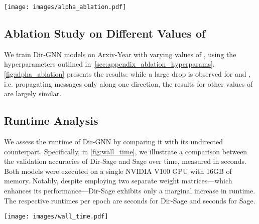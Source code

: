 \documentclass{article}
\newcommand\oursacro{Dir-GNN}
\theoremstyle{plain}
\theoremstyle{definition}
\theoremstyle{remark}
\begin{document}
\begin{figure*}
    \centering
    \texttt{[image: images/alpha\_ablation.pdf]}
    \caption{\oursacro{} test accuracy on Arxiv-Year for different values of the hyperparameter .}
    \label{fig:alpha_ablation}
\end{figure*}

\subsection{Ablation Study on Different Values of \texorpdfstring{}{alpha}}
We train \oursacro{} models on Arxiv-Year with varying values of , using the hyperparameters outlined in~\cref{sec:appendix_ablation_hyperparams}. \cref{fig:alpha_ablation} presents the results: while a large drop is observed for  and , i.e. propagating messages only along one direction, the results for other values of  are largely similar. 

\subsection{Runtime Analysis}
We assess the runtime of Dir-GNN by comparing it with its undirected counterpart. Specifically, in \cref{fig:wall_time}, we illustrate a comparison between the validation accuracies of Dir-Sage and Sage over time, measured in seconds. Both models were executed on a single NVIDIA V100 GPU  with 16GB of memory. Notably, despite employing two separate weight matrices—which enhances its performance—Dir-Sage exhibits only a marginal increase in runtime. The respective runtimes per epoch are  seconds for Dir-Sage and  seconds for Sage.

\begin{figure*}
    \centering
    \texttt{[image: images/wall\_time.pdf]}
    \caption{Validation Accuracy of Dir-Sage and Sage, displayed as a function of time (seconds).}
    \label{fig:wall_time}
\end{figure*}













 
\end{document}

